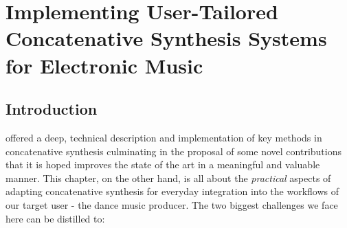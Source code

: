 \chapter{Implementing User-Tailored Concatenative Synthesis Systems for Electronic Music}
\label{chap:rhythmcat}

%
%
%
%
%
%
%

\section{Introduction}

 offered a deep, technical description and implementation of key methods in concatenative synthesis culminating in the proposal of some novel contributions that it is hoped improves the state of the art in a meaningful and valuable manner. This chapter, on the other hand, is all about the \textit{practical} aspects of adapting concatenative synthesis for everyday integration into the workflows of our target user - the dance music producer. The two biggest challenges we face here can be distilled to:

